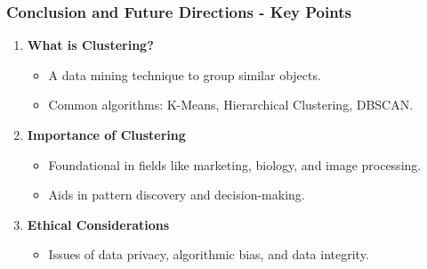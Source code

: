 \documentclass[aspectratio=169]{beamer}
\begin{document}
\begin{frame}[fragile]
    \frametitle{Conclusion and Future Directions - Key Points}
    \begin{enumerate}
        \item \textbf{What is Clustering?}
            \begin{itemize}
                \item A data mining technique to group similar objects.
                \item Common algorithms: K-Means, Hierarchical Clustering, DBSCAN.
            \end{itemize}

        \item \textbf{Importance of Clustering}
            \begin{itemize}
                \item Foundational in fields like marketing, biology, and image processing.
                \item Aids in pattern discovery and decision-making.
            \end{itemize}
        
        \item \textbf{Ethical Considerations}
            \begin{itemize}
                \item Issues of data privacy, algorithmic bias, and data integrity.
            \end{itemize}
    \end{enumerate}
\end{frame}
\end{document}
